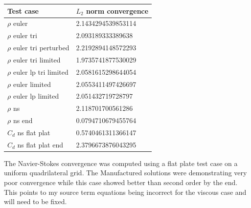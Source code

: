 \documentclass[12pt,parskip=full]{article}
\numberwithin{subsection}{section}
\begin{document}
		\begin{centering}
		\begin{tabular}[H]{ l | l }
			Test case				 & $L_2$ norm convergence \\ \hline
			$\rho$ euler                & 2.1434294539853114 \\
			$\rho$ euler tri            & 2.093189333389638 \\
			$\rho$ euler tri perturbed  & 2.2192894148572293 \\
			$\rho$ euler tri limited    & 1.9735741877530029 \\
			$\rho$ euler lp tri limited & 2.0581615298644054 \\
			$\rho$ euler limited        & 2.0553411497426697 \\
			$\rho$ euler lp limited     & 2.051432719728797 \\
			$\rho$ ns                   & 2.118701700561286 \\
			$\rho$ ns end               & 0.0794710679455764 \\
			$C_d$ ns flat plat        & 0.5740461311366147 \\
			$C_d$ ns flat plat end    & 2.3796673876043295 \\
		\end{tabular}
		\end{centering}

		The Navier-Stokes convergence was computed using a flat plate test case on a uniform quadrilateral grid. The Manufactured solutions
		were demonstrating very poor convergence while this case showed better than second order by the end. This points to my source term 
		equations being incorrect for the viscous case and will need to be fixed.
\end{document}
